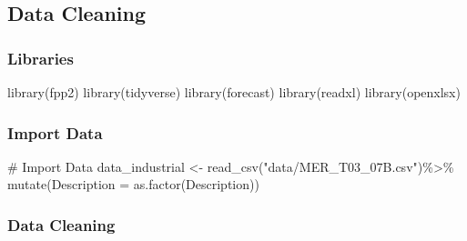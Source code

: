\documentclass[
  letterpaper,
  DIV=11,
  numbers=noendperiod]{scrartcl}
\newenvironment{Shaded}{\begin{snugshade}}{\end{snugshade}}
\newcommand{\AttributeTok}[1]{\textcolor[rgb]{0.40,0.45,0.13}{#1}}
\newcommand{\CommentTok}[1]{\textcolor[rgb]{0.37,0.37,0.37}{#1}}
\newcommand{\FunctionTok}[1]{\textcolor[rgb]{0.28,0.35,0.67}{#1}}
\newcommand{\NormalTok}[1]{\textcolor[rgb]{0.00,0.23,0.31}{#1}}
\newcommand{\OtherTok}[1]{\textcolor[rgb]{0.00,0.23,0.31}{#1}}
\newcommand{\SpecialCharTok}[1]{\textcolor[rgb]{0.37,0.37,0.37}{#1}}
\newcommand{\StringTok}[1]{\textcolor[rgb]{0.13,0.47,0.30}{#1}}
\begin{document}
\subsection{Data Cleaning}\label{data-cleaning}

\subsubsection{Libraries}\label{libraries}

\begin{Shaded}
\begin{Highlighting}[]
\FunctionTok{library}\NormalTok{(fpp2)}
\FunctionTok{library}\NormalTok{(tidyverse)}
\FunctionTok{library}\NormalTok{(forecast)}
\FunctionTok{library}\NormalTok{(readxl)}
\FunctionTok{library}\NormalTok{(openxlsx)}
\end{Highlighting}
\end{Shaded}

\subsubsection{Import Data}\label{import-data}

\begin{Shaded}
\begin{Highlighting}[]
\CommentTok{\# Import Data}
\NormalTok{data\_industrial }\OtherTok{\textless{}{-}} \FunctionTok{read\_csv}\NormalTok{(}\StringTok{"data/MER\_T03\_07B.csv"}\NormalTok{)}\SpecialCharTok{\%\textgreater{}\%}
  \FunctionTok{mutate}\NormalTok{(}\AttributeTok{Description =} \FunctionTok{as.factor}\NormalTok{(Description))}
\end{Highlighting}
\end{Shaded}

\subsubsection{Data Cleaning}\label{data-cleaning-1}

\begin{Shaded}
\end{Shaded}
\end{document}
